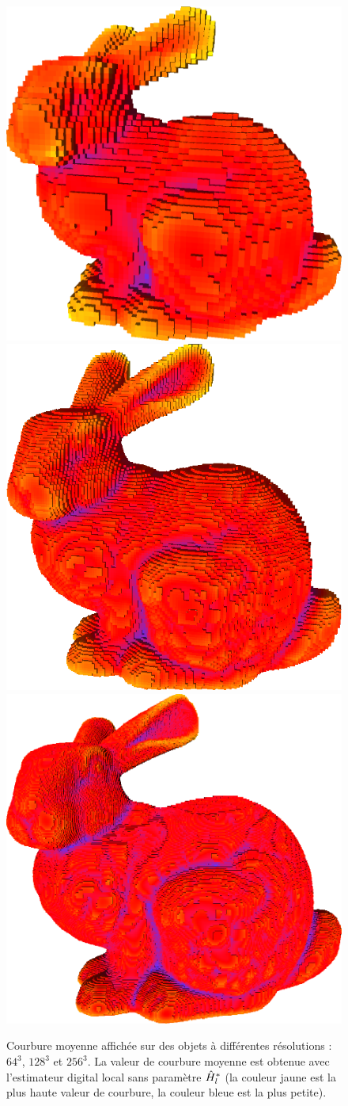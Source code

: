 \begin{figure}[ht]
\begin{center}
  \includegraphics[width=.30\linewidth]{images/Curvature/Bunny_64_mean}
  \includegraphics[width=.30\linewidth]{images/Curvature/Bunny_128_mean}
  \includegraphics[width=.30\linewidth]{images/Curvature/Bunny_256_mean}
\end{center}
  \caption{Courbure moyenne affichée sur des objets \Bunny à différentes résolutions : $64^3$, $128^3$ et $256^3$. La valeur de courbure moyenne est obtenue avec l'estimateur digital local sans paramètre $\hat{H}^{*}_{l}$ (la couleur jaune est la plus haute valeur de courbure, la couleur bleue est la plus petite). \label{fig:mean-curv-different-scale}}
\end{figure}
%

